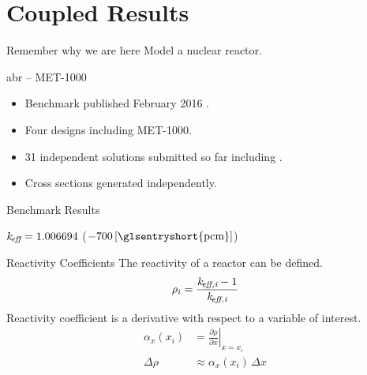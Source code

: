 \section{Coupled Results}
\label{sec:coupledResults}

\begin{frame}{Remember why we are here}
  \pause
  \huge Model a nuclear reactor.
\end{frame}

\begin{frame}{\gls{abr} -- MET-1000}
  \begin{itemize}
    \item Benchmark published February 2016 \cite{abr}.
    \item Four designs including MET-1000.
    \item 31 independent solutions submitted so far including \dif.
    \item Cross sections generated independently.
  \end{itemize}
\end{frame}

\begin{frame}{Benchmark Results}
  \vspace{-0.2in}
  \begin{figure}
    \centering
    \hspace{1in}
  \end{figure}
  \vspace{-0.1in}
  \begin{center}
    $k_{\!\mbox{\scriptsize \em eff}} =  1.006694 $ \quad (\dif $-700\units{\glsentryshort{pcm}}$)
  \end{center}
\end{frame}

\begin{frame}{Reactivity Coefficients}
  The reactivity of a reactor can be defined.
  \begin{equation}
    \label{eq:reactivity}
    \rho_i = \frac{k_{\!\mbox{\scriptsize \em eff,{i}}} - 1}{k_{\!\mbox{\scriptsize \em eff,{i}}}}
  \end{equation}
  Reactivity coefficient is a derivative with respect to a variable of interest.
  \begin{align}
    \label{eq:reactivity_coefficient}
    \alpha_x(x_i) &= \left. \frac{\partial \rho}{\partial x} \right|_{x=x_i} \\
    \Delta \rho &\approx \alpha_x(x_i) \, \Delta x
  \end{align}
\end{frame}

